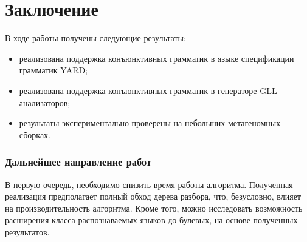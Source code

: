 \documentclass[14pt]{matmex-diploma}
\begin{document}
\section*{Заключение}
В ходе работы получены следующие результаты:
\begin{itemize}
    \item реализована поддержка конъюнктивных грамматик в языке спецификации грамматик YARD;
    \item реализована поддержка конъюнктивных грамматик в генераторе GLL-анализаторов;
    \item результаты экспериментально проверены на небольших метагеномных сборках.
\end{itemize}

\subsubsection*{Дальнейшее направление работ}

В первую очередь, необходимо снизить время работы алгоритма. Полученная реализация предполагает полный обход дерева разбора, что, безусловно, влияет на производительность алгоритма. Кроме того, можно исследовать возможность расширения класса распознаваемых языков до булевых, на основе полученных результатов.

\setmonofont[Mapping=tex-text]{CMU Typewriter Text}


\end{document}
